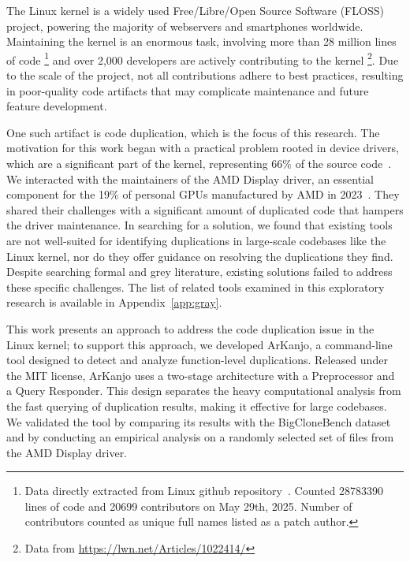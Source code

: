 \en

The Linux kernel is a widely used Free/Libre/Open Source Software (FLOSS) project,
powering the majority of webservers and smartphones worldwide.
Maintaining the kernel is an enormous task, involving more than 28 million lines of 
code
\footnote{Data directly extracted from Linux github repository~\citep{linuxrepo}.
Counted  28783390 lines of code and 20699 contributors on May 29th, 2025.
Number of contributors counted as unique full names listed as a patch author.}
and over 2,000 developers are actively contributing to the kernel
\footnote{Data from \url{https://lwn.net/Articles/1022414/}}.
Due to the scale of the project, not all contributions adhere to best practices, resulting 
in poor-quality code artifacts that may complicate maintenance and future feature development.

One such artifact is code duplication, which is the focus of this research. The motivation for 
this work began with a practical problem rooted in device drivers, which are a significant part 
of the kernel, representing 66\% of the source code~\citep{marcelo}. We interacted with the 
maintainers of the AMD Display driver, an essential component for the 19\% of personal GPUs 
manufactured by AMD in 2023~\citep{gpumarket}. They shared their challenges with a significant 
amount of duplicated code that hampers the driver maintenance. In searching for a solution, 
we found that existing tools are not well-suited for identifying duplications in large-scale 
codebases like the Linux kernel, nor do they offer guidance on resolving the duplications 
they find. Despite searching formal and grey literature, existing solutions failed to address
these specific challenges. The list of related tools examined in this exploratory 
research is available in Appendix~\ref{app:gray}.

This work presents an approach to address the code duplication issue in the Linux kernel; to 
support this approach, we developed ArKanjo, a command-line tool designed to detect and analyze 
function-level duplications. Released under the MIT license, ArKanjo uses a two-stage 
architecture with a Preprocessor and a Query Responder. This design separates the heavy 
computational analysis from the fast querying of duplication results, making it effective for 
large codebases. We validated the tool by comparing its results with the BigCloneBench
dataset~\citep{bigclonebench} and by conducting an empirical analysis on a randomly selected set of 
files from the AMD Display driver.

